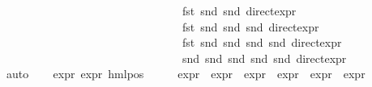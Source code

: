 \begin{isabellebody}
\ \ \ \ \ \ \ \ \ \ \ \ \ \ \ \ \ \ \ \ \ \ \ \ \ \ \ \ \ \ \ \ fst\ {\isacharparenleft}{\kern0pt}snd\ {\isacharparenleft}{\kern0pt}snd\ {\isacharparenleft}{\kern0pt}direct{\isacharunderscore}{\kern0pt}expr\ {\isasymphi}{\isacharparenright}{\kern0pt}{\isacharparenright}{\kern0pt}{\isacharparenright}{\kern0pt}{\isacharcomma}{\kern0pt}\ \isanewline
\ \ \ \ \ \ \ \ \ \ \ \ \ \ \ \ \ \ \ \ \ \ \ \ \ \ \ \ \ \ \ \ fst\ {\isacharparenleft}{\kern0pt}snd\ {\isacharparenleft}{\kern0pt}snd\ {\isacharparenleft}{\kern0pt}snd\ {\isacharparenleft}{\kern0pt}direct{\isacharunderscore}{\kern0pt}expr\ {\isasymphi}{\isacharparenright}{\kern0pt}{\isacharparenright}{\kern0pt}{\isacharparenright}{\kern0pt}{\isacharparenright}{\kern0pt}{\isacharcomma}{\kern0pt}\ \isanewline
\ \ \ \ \ \ \ \ \ \ \ \ \ \ \ \ \ \ \ \ \ \ \ \ \ \ \ \ \ \ \ \ fst\ {\isacharparenleft}{\kern0pt}snd\ {\isacharparenleft}{\kern0pt}snd\ {\isacharparenleft}{\kern0pt}snd\ {\isacharparenleft}{\kern0pt}snd\ {\isacharparenleft}{\kern0pt}direct{\isacharunderscore}{\kern0pt}expr\ {\isasymphi}{\isacharparenright}{\kern0pt}{\isacharparenright}{\kern0pt}{\isacharparenright}{\kern0pt}{\isacharparenright}{\kern0pt}{\isacharparenright}{\kern0pt}{\isacharcomma}{\kern0pt}\ \isanewline
\ \ \ \ \ \ \ \ \ \ \ \ \ \ \ \ \ \ \ \ \ \ \ \ \ \ \ \ \ \ \ \ snd\ {\isacharparenleft}{\kern0pt}snd\ {\isacharparenleft}{\kern0pt}snd\ {\isacharparenleft}{\kern0pt}snd\ {\isacharparenleft}{\kern0pt}snd\ {\isacharparenleft}{\kern0pt}direct{\isacharunderscore}{\kern0pt}expr\ {\isasymphi}{\isacharparenright}{\kern0pt}{\isacharparenright}{\kern0pt}{\isacharparenright}{\kern0pt}{\isacharparenright}{\kern0pt}{\isacharparenright}{\kern0pt}{\isacharparenright}{\kern0pt}{\isachardoublequoteclose}\isanewline
\ \ \ \ \isamarkupfalse%
\ auto\isanewline
\ \ \isamarkupfalse%
\ expr{\isacharcolon}{\kern0pt}\ {\isachardoublequoteopen}expr\ {\isacharparenleft}{\kern0pt}hml{\isacharunderscore}{\kern0pt}pos\ {\isasymalpha}\ {\isasymphi}{\isacharparenright}{\kern0pt}\ {\isacharequal}{\kern0pt}\ {\isacharparenleft}{\kern0pt}{}\ {\isacharplus}{\kern0pt}\ {\isacharparenleft}{\kern0pt}expr{\isacharunderscore}{\kern0pt}{}\ {\isasymphi}{\isacharparenright}{\kern0pt}{\isacharcomma}{\kern0pt}\ expr{\isacharunderscore}{\kern0pt}{}\ {\isasymphi}{\isacharcomma}{\kern0pt}\ expr{\isacharunderscore}{\kern0pt}{}\ {\isasymphi}{\isacharcomma}{\kern0pt}\ expr{\isacharunderscore}{\kern0pt}{}\ {\isasymphi}{\isacharcomma}{\kern0pt}\ expr{\isacharunderscore}{\kern0pt}{}\ {\isasymphi}{\isacharcomma}{\kern0pt}\ expr{\isacharunderscore}{\kern0pt}{}\ {\isasymphi}{\isacharparenright}{\kern0pt}{\isachardoublequoteclose}\isanewline

\end{isabellebody}
